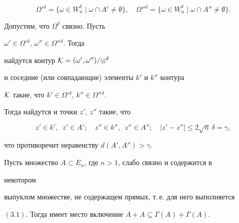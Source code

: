 \begin{pf}
$$ 


\Omega'{}^\delta=\{\omega\in W^\delta_n\mid\omega\cap 


A'\ne\emptyset\},\quad 


\Omega''{}^\delta=\{\omega\in W^\delta_n\mid\omega\cap A''\ne 


\emptyset\}. 


$$ 


Допустим, что $\Omega^\delta$ связно. Пусть 


$\omega'\in\Omega'{}^\delta$, $\omega''\in\Omega''{}^\delta$. Тогда 


найдутся контур $\cal K=(\omega',\omega'')/\Omega^\delta$ 


и соседние (или совпадающие) элементы $k'$ и $k''$ контура 


$\cal K$ такие, что $k'\in\Omega'{}^\delta$, $k''\in\Omega''{}^\delta$. 


Тогда найдутся и точки $z'$, $z''$ такие, что 


$$ 


z'\in k',\ \; z'\in A';\quad 


z''\in k'',\ \; z''\in A'';\quad 


|z'-z''|\le2\sqrt{n}\,\delta=\gamma, 


$$ 


что противоречит неравенству $d(A',A'')>\gamma$. 


\end{pf} 


 


\begin{thm} 


Пусть множество $A\subset E_n$, где $n>1$, слабо связно и содержится в 


некотором 


выпуклом множестве, не содержащем прямых, т.\,е. для него выполняется 


$(3.1)$. Тогда имеет место включение $A+A\subseteq\Gamma(A)+\Gamma(A)$. 


\end{thm} 


 


